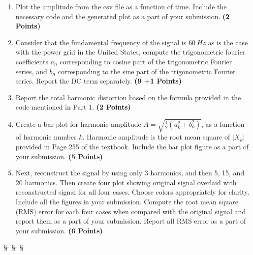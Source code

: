\documentclass[12pt, xcolor=dvipsnames,svgnames,x11names]{article}
\begin{document}
\begin{enumerate}

\item Plot the amplitude from the csv file as a function of time. Include the necessary code and the generated plot as a part of your submission. \hfill \textbf{(2 Points)}

\item Consider that the fundamental frequency of the signal is $60~Hz$ as is the case with the power grid in the United States, compute the trigonometric fourier coefficients $a_n$ corresponding to cosine part of the trigonometric Fourier series, and $b_n$ corresponding to the sine part of the trigonometric Fourier series. Report the DC term separately. \hfill \textbf{(9 +1 Points)}

\item Report the total harmonic distortion based on the formula provided in the code mentioned in Part 1. \hfill \textbf{(2 Points)}

\item Create a bar plot for harmonic amplitude $A = \sqrt{\tfrac{1}{2}(a_k^2 + b_k^2)}$, as a function of harmonic number $k$. Harmonic amplitude is the root mean square of $|X_k|$ provided in Page 255 of the textbook. Include the bar plot figure as a part of your submission. \hfill \textbf{(5 Points)}

\item Next, reconstruct the signal by using only 3 harmonics, and then 5, 15, and 20 harmonics. Then create four plot showing original signal overlaid with reconstructed signal for all four cases. Choose colors appropriately for clarity. Include all the figures in your submission. Compute the root mean square (RMS) error for each four cases when compared with the original signal and report them as a part of your submission. Report all RMS error as a part of your submission.  \hfill \textbf{(6 Points)}


\end{enumerate}

\begin{center}
   \S - \S - \S
\end{center}
\end{document}
